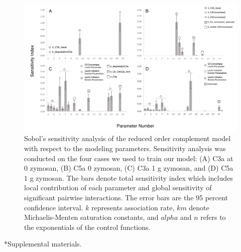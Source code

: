 \documentclass[12pt]{article}
\makeatletter
\renewcommand\section{\@startsection
	{subsection}{2}{0mm}
	{-0.2in}
	{0.05\baselineskip}
	{\normalfont\large\bfseries}}
\makeatother
\begin{document}
\begin{figure}[h]
\centering
\includegraphics[width=1.0\textwidth]{./figs/Figure4_Sensitivity_Analysis_may25.pdf}
\caption{Sobol's sensitivity analysis of the reduced order complement model with respect to the modeling parameters.  Sensitivity analysis was conducted on the four cases we used to train our model: (A) C3a at 0 zymosan, (B) C5a 0 zymosan, (C) C3a 1 g zymosan, and (D) C5a $1$ g zymosan. The bars denote total sensitivity index which includes local contribution of each parameter and global sensitivity of significant pairwise interactions. The error bars are the 95 percent confidence interval. $k$ represents association rate, $km$ denote Michaelis-Menten saturation constants, and $alpha$ and $n$ refers to the exponentials of the control functions.}\label{fig-SA}
\end{figure}

\clearpage

\renewcommand\thefigure{S\arabic{figure}}
\renewcommand\thetable{T\arabic{table}}
\renewcommand\thepage{S-\arabic{page}}
\renewcommand\theequation{S\arabic{equation}}

\setcounter{equation}{0}
\setcounter{table}{0}
\setcounter{figure}{0}
\setcounter{page}{1}


\section*{Supplemental materials.}
\end{document}
